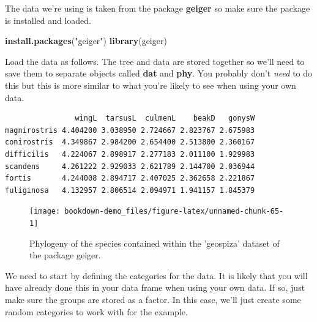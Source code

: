 \documentclass[
]{book}
\newenvironment{Shaded}{\begin{snugshade}}{\end{snugshade}}
\newcommand{\KeywordTok}[1]{\textcolor[rgb]{0.13,0.29,0.53}{\textbf{#1}}}
\newcommand{\NormalTok}[1]{#1}
\newcommand{\OperatorTok}[1]{\textcolor[rgb]{0.81,0.36,0.00}{\textbf{#1}}}
\newcommand{\StringTok}[1]{\textcolor[rgb]{0.31,0.60,0.02}{#1}}
\begin{document}
The data we're using is taken from the package \textbf{geiger} \citep{geiger} so make sure the package is installed and loaded.

\begin{Shaded}
\begin{Highlighting}[]
\KeywordTok{install.packages}\NormalTok{(}\StringTok{"geiger"}\NormalTok{)}
\KeywordTok{library}\NormalTok{(geiger)}
\end{Highlighting}
\end{Shaded}

Load the data as follows. The tree and data are stored together so we'll need to save them to separate objects called \textbf{dat} and \textbf{phy}. You probably don't \emph{need} to do this but this is more similar to what you're likely to see when using your own data.

\begin{Shaded}
\end{Shaded}

\begin{verbatim}
                wingL  tarsusL  culmenL    beakD   gonysW
magnirostris 4.404200 3.038950 2.724667 2.823767 2.675983
conirostris  4.349867 2.984200 2.654400 2.513800 2.360167
difficilis   4.224067 2.898917 2.277183 2.011100 1.929983
scandens     4.261222 2.929033 2.621789 2.144700 2.036944
fortis       4.244008 2.894717 2.407025 2.362658 2.221867
fuliginosa   4.132957 2.806514 2.094971 1.941157 1.845379
\end{verbatim}

\begin{figure}[H]

{\centering \texttt{[image: bookdown-demo\_files/figure-latex/unnamed-chunk-65-1]} 

}

\caption{Phylogeny of the species contained within the 'geospiza' dataset of the package geiger.}\label{fig:unnamed-chunk-65}
\end{figure}

We need to start by defining the categories for the data. It is likely that you will have already done this in your data frame when using your own data. If so, just make sure the groups are stored as a factor. In this case, we'll just create some random categories to work with for the example.
\end{document}
